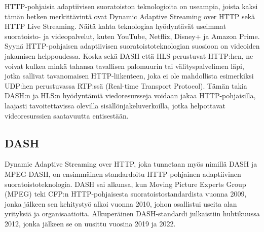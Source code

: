 \documentclass[finnish, 12pt, a4paper, elec, utf8, a-1b, online]{aaltothesis}
\begin{document}
\begin{table}[htb]
  \caption{Esimerkki siitä, miltä Dynamic Adaptive Streaming over HTTP:n kaistanleveystikas voisi näyttää. \cite{Bitrate ladder} \label{taulukko4}}
  \centering
\end{table}

\noindent HTTP-pohjaisia adaptiivisen suoratoiston teknologioita on useampia, joista kaksi tämän hetken merkittävintä ovat Dynamic Adaptive Streaming over HTTP sekä HTTP Live Streaming. Näitä kahta teknologiaa hyödyntävät useimmat suoratoisto- ja videopalvelut, kuten YouTube, Netflix, Disney+ ja Amazon Prime. Syynä HTTP-pohjaisen adaptiivisen suoratoistoteknologian suosioon on videoiden jakamisen helppoudessa. Koska sekä DASH että HLS perustuvat HTTP:hen, ne voivat kulkea minkä tahansa tavallisen palomuurin tai välityspalvelimen läpi, jotka sallivat tavanomaisen HTTP-liikenteen, joka ei ole mahdollista esimerkiksi UDP:hen perustuvassa RTP:ssä (Real-time Transport Protocol). Tämän takia DASH:n ja HLS:n hyödyntämiä viedoresursseja voidaan jakaa HTTP-pohjaisilla, laajasti tavoitettavissa olevilla sisällönjakeluverkoilla, jotka helpottavat videoresurssien saatavuutta entisestään. \\

\subsection*{DASH}

Dynamic Adaptive Streaming over HTTP, joka tunnetaan myös nimillä DASH ja MPEG-DASH, on ensimmäinen standardoitu HTTP-pohjainen adaptiivinen suoratoistoteknologia. DASH sai alkunsa, kun Moving Picture Experts Group (MPEG) teki CFP:n HTTP-pohjaisesta suoratoistostandardista vuonna 2009, jonka jälkeen sen kehitystyö alkoi vuonna 2010, johon osallistui useita alan yrityksiä ja organisaatioita. Alkuperäinen DASH-standardi julkaistiin huhtikuussa 2012, jonka jälkeen se on uusittu vuosina 2019 ja 2022. \\
\end{document}
